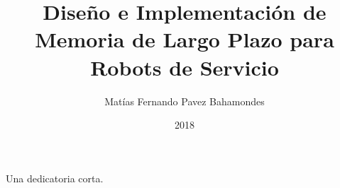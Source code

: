 \documentclass[upright, contnum]{umemoria}
\author{Matías Fernando Pavez Bahamondes}
\title{Diseño e Implementación de Memoria de Largo Plazo para Robots de Servicio}
\date{2018}
\begin{document}
\frontmatter
\maketitle

\begin{abstract}
\lipsum[1-2]
\end{abstract}

\begin{dedicatoria}
Una dedicatoria corta.
\end{dedicatoria}

\begin{thanks}
\lipsum[1-2]
\end{thanks}

\cleardoublepage
\tableofcontents
\cleardoublepage
\listoftables
\cleardoublepage
\listoffigures

\mainmatter










%
%
\end{document}
